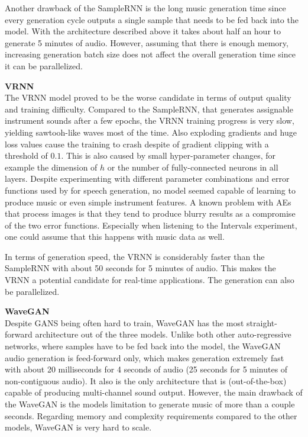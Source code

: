 \documentclass[12pt]{article}
\begin{document}
Another drawback of the SampleRNN is the long music generation time since every generation cycle outputs a single sample that needs to be fed back into the model.
With the architecture described above it takes about half an hour to generate 5 minutes of audio.
However, assuming that there is enough memory, increasing generation batch size does not affect the overall generation time since it can be parallelized.



\textbf{VRNN}\\
The VRNN model proved to be the worse candidate in terms of output quality and training difficulty.
Compared to the SampleRNN, that generates assignable instrument sounds after a few epochs, the VRNN training progress is very slow, yielding sawtooh-like waves most of the time.
Also exploding gradients and huge loss values cause the training to crash despite of gradient clipping with a threshold of $0.1$.
This is also caused by small hyper-parameter changes, for example the dimension of $h$ or the number of fully-connected neurons in all layers.
Despite experimenting with different parameter combinations and error functions used by \cite{chung2015recurrent} for speech generation, no model seemed capable of learning to produce music or even simple instrument features.
A known problem with AEs that process images is that they tend to produce blurry results as a compromise of the two error functions.
Especially when listening to the Intervals experiment, one could assume that this happens with music data as well.

In terms of generation speed, the VRNN is considerably faster than the SampleRNN with about 50 seconds for 5 minutes of audio.
This makes the VRNN a potential candidate for real-time applications.
The generation can also be parallelized.


\textbf{WaveGAN}\\
Despite GANS being often hard to train, WaveGAN has the most straight-forward architecture out of the three models.
Unlike both other auto-regressive networks, where samples have to be fed back into the model, the WaveGAN audio generation is feed-forward only, which makes generation extremely fast with about 20 milliseconds for 4 seconds of audio (25 seconds for 5 minutes of non-contiguous audio).
It also is the only architecture that is (out-of-the-box) capable of producing multi-channel sound output.
However, the main drawback of the WaveGAN is the models limitation to generate music of more than a couple seconds.
Regarding memory and complexity requirements compared to the other models, WaveGAN is very hard to scale.
\end{document}
